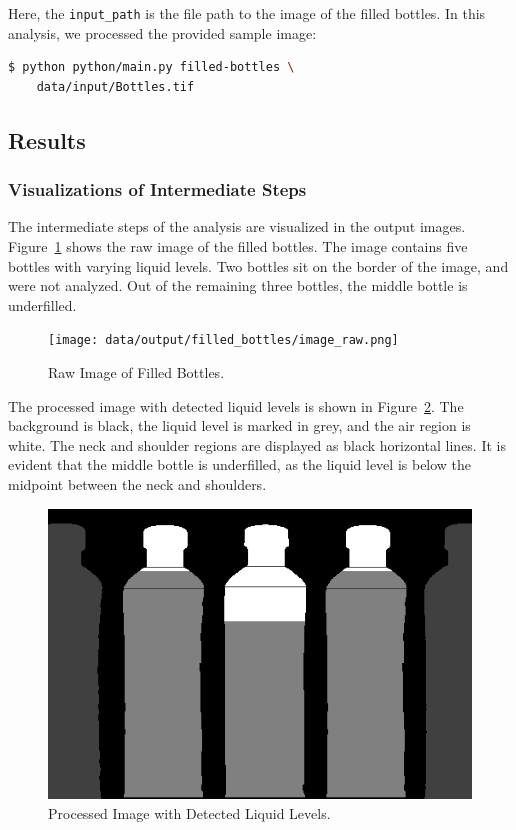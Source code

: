 \documentclass[a4paper,12pt]{article}
\begin{document}
Here, the \texttt{input\_path} is the file path to the image of the filled bottles. In this analysis, we processed the provided sample image:

\begin{lstlisting}[language=bash]
$ python python/main.py filled-bottles \
    data/input/Bottles.tif
\end{lstlisting}

\subsection{Results}

\subsubsection{Visualizations of Intermediate Steps}

The intermediate steps of the analysis are visualized in the output images. Figure~\ref{fig:bottle_raw} shows the raw image of the filled bottles. The image contains five bottles with varying liquid levels. Two bottles sit on the border of the image, and were not analyzed. Out of the remaining three bottles, the middle bottle is underfilled.

\begin{figure}[!htbp]
    \centering
    \texttt{[image: data/output/filled\_bottles/image\_raw.png]}
    \caption{Raw Image of Filled Bottles.}
    \label{fig:bottle_raw}
\end{figure}

The processed image with detected liquid levels is shown in Figure~\ref{fig:bottle_processed}. The background is black, the liquid level is marked in grey, and the air region is white. The neck and shoulder regions are displayed as black horizontal lines. It is evident that the middle bottle is underfilled, as the liquid level is below the midpoint between the neck and shoulders.

\begin{figure}[!htbp]
    \centering
    \includegraphics[width=0.5\linewidth]{data/output/filled_bottles/final_image.png}
    \caption{Processed Image with Detected Liquid Levels.}
    \label{fig:bottle_processed}
\end{figure}
\end{document}
